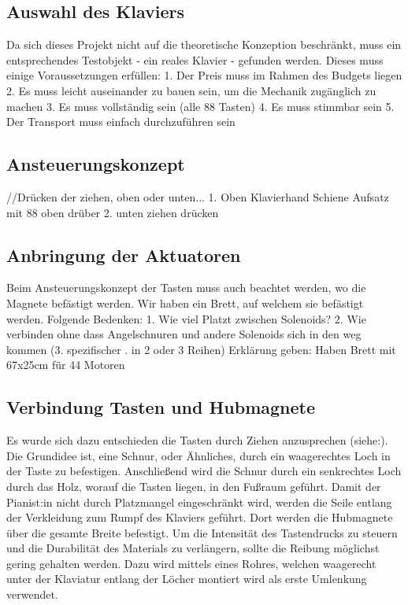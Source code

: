 \subsection{Auswahl des Klaviers}

Da sich dieses Projekt nicht auf die theoretische Konzeption beschränkt, muss ein entsprechendes Testobjekt - ein reales Klavier - gefunden werden.
Dieses muss einige Voraussetzungen erfüllen:
	1. Der Preis muss im Rahmen des Budgets liegen
	2. Es muss leicht auseinander zu bauen sein, um die Mechanik zugänglich zu machen
	3. Es muss vollständig sein (alle 88 Tasten)
	4. Es muss stimmbar sein
	5. Der Transport muss einfach durchzuführen sein


\subsection{Ansteuerungskonzept}

//Drücken der ziehen, oben oder unten...
1. Oben
	Klavierhand
	Schiene
	Aufsatz mit 88 oben drüber
2. unten
	ziehen
	drücken

\subsection{Anbringung der Aktuatoren}
Beim Ansteuerungskonzept der Tasten muss auch beachtet werden, wo die Magnete befästigt werden.
Wir haben ein Brett, auf welchem sie befästigt werden. Folgende Bedenken:
1. Wie viel Platzt zwischen Solenoids? 2. Wie verbinden ohne dass Angelschnuren und andere Solenoids sich in den weg kommen
(3. spezifischer . in 2 oder 3 Reihen)
Erklärung geben: Haben Brett mit 67x25cm für 44 Motoren


\subsection{Verbindung Tasten und Hubmagnete}

Es wurde sich dazu entschieden die Tasten durch Ziehen anzusprechen (siehe:).
Die Grundidee ist, eine Schnur, oder Ähnliches, durch ein waagerechtes Loch in der Taste zu befestigen.
Anschließend wird die Schnur durch ein senkrechtes Loch durch das Holz, worauf die Tasten liegen, in den Fußraum geführt.
Damit der Pianist:in nicht durch Platzmangel eingeschränkt wird, werden die Seile entlang der Verkleidung zum Rumpf des Klaviers geführt.
Dort werden die Hubmagnete über die gesamte Breite befestigt.
Um die Intensität des Tastendrucks zu steuern und die Durabilität des Materials zu verlängern, sollte die Reibung möglichst gering gehalten werden.
Dazu wird mittels eines Rohres, welchen waagerecht unter der Klaviatur entlang der Löcher montiert wird als erste Umlenkung verwendet.


